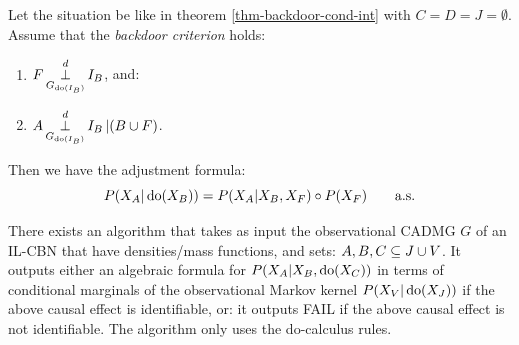 \begin{Cor}\label{cor:backdoor_adjustment}
    Let the situation be like in theorem \ref{thm-backdoor-cond-int} with $C=D=J= \emptyset$.
    Assume that the \emph{backdoor criterion} holds:
\begin{enumerate}
    \item $\displaystyle F \operatorname*{\perp}^d_{G_{\operatorname{do}(I_B)}} I_B$, and:
    \item $\displaystyle A \operatorname*{\perp}^d_{G_{\operatorname{do}(I_B)}} I_B  \operatorname*{|} (B \cup F)$.
\end{enumerate}
Then we have the adjustment formula:
\[ P(X_A|\operatorname{do}(X_B)) = 
    P(X_A|X_B,X_F) \circ P(X_F) \qquad \text{a.s.}
\]
\end{Cor}

\begin{Rem}
    There exists an algorithm that takes as input the observational CADMG $G$ of an IL-CBN that have densities/mass functions,
    and sets: $A,B,C \subseteq J \cup V$.
    It outputs either an algebraic formula for $P(X_A|X_B,\operatorname{do}(X_C))$ in terms of conditional marginals 
    of the observational Markov kernel $P(X_V|\operatorname{do}(X_J))$ if the above causal effect is identifiable, or: it outputs FAIL 
    if the above causal effect is not identifiable.
    The algorithm only uses the do-calculus rules.
\end{Rem}
